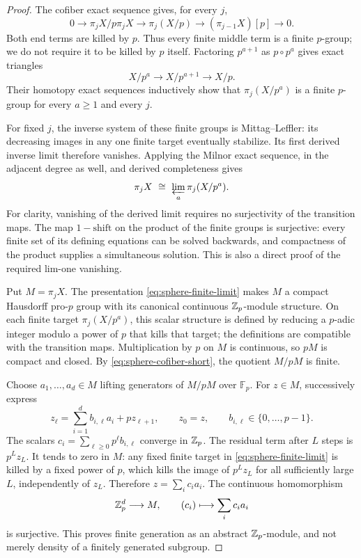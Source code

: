 \begin{proof}
The cofiber exact sequence gives, for every $j$,
\begin{equation}\label{eq:sphere-cofiber-short}
 0\longrightarrow \pi_jX/p\pi_jX
 \longrightarrow \pi_j(X/p)
 \longrightarrow (\pi_{j-1}X)[p]
 \longrightarrow0.
\end{equation}
Both end terms are killed by $p$.  Thus every finite middle term is a
finite $p$-group; we do not require it to be killed by $p$ itself.
Factoring $p^{a+1}$ as $p\circ p^a$ gives exact triangles
\[
 X/p^a\longrightarrow X/p^{a+1}\longrightarrow X/p.
\]
Their homotopy exact sequences inductively show that
$\pi_j(X/p^a)$ is a finite $p$-group for every $a\geq1$ and every $j$.

For fixed $j$, the inverse system of these finite groups is
Mittag--Leffler: its decreasing images in any one finite target
eventually stabilize.  Its first derived inverse limit therefore
vanishes.  Applying the Milnor exact sequence, in the adjacent degree
as well, and derived completeness gives
\begin{equation}\label{eq:sphere-finite-limit}
 \pi_jX\ \cong\ \varprojlim_a\pi_j(X/p^a).
\end{equation}
For clarity, vanishing of the derived limit requires no surjectivity of
the transition maps.  The map $1-\mathrm{shift}$ on the product of the
finite groups is surjective: every finite set of its defining equations
can be solved backwards, and compactness of the product supplies a
simultaneous solution.  This is also a direct proof of the required
lim-one vanishing.

Put $M=\pi_jX$.  The presentation \eqref{eq:sphere-finite-limit} makes
$M$ a compact Hausdorff pro-$p$ group with its canonical continuous
$\mathbb Z_p$-module structure.  On each finite target $\pi_j(X/p^a)$, this scalar structure is
defined by reducing a $p$-adic integer modulo a power of $p$ that kills
that target; the definitions are compatible with the transition
maps.  Multiplication by $p$ on $M$ is continuous, so $pM$ is compact
and closed.  By \eqref{eq:sphere-cofiber-short}, the quotient $M/pM$ is
finite.

Choose $a_1,\ldots,a_d\in M$ lifting generators of $M/pM$ over
$\mathbb F_p$.  For $z\in M$, successively express
\[
 z_\ell=\sum_{i=1}^d b_{i,\ell}a_i+pz_{\ell+1},
 \qquad z_0=z,\qquad b_{i,\ell}\in\{0,\ldots,p-1\}.
\]
The scalars $c_i=\sum_{\ell\geq0}p^\ell b_{i,\ell}$ converge in $\mathbb Z_p$.
The residual term after $L$ steps is $p^Lz_L$.  It tends to zero in
$M$: any fixed finite target in \eqref{eq:sphere-finite-limit} is
killed by a fixed power of $p$, which kills the image of $p^Lz_L$ for
all sufficiently large $L$, independently of $z_L$.  Therefore
$z=\sum_i c_i a_i$.  The continuous homomorphism
\[
 \mathbb Z_p^d\longrightarrow M,\qquad (c_i)\longmapsto\sum_i c_i a_i
\]
is surjective.  This proves finite generation as an abstract
$\mathbb Z_p$-module, and not merely density of a finitely generated subgroup.


\end{proof}
